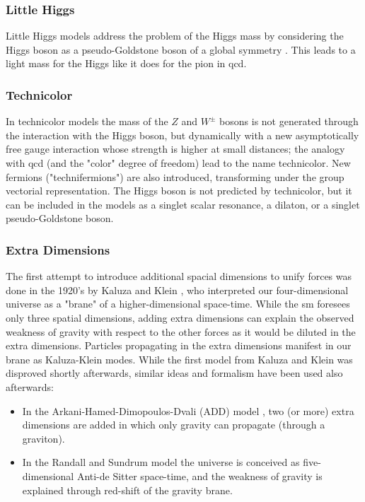 \subsubsection*{Little Higgs}
Little Higgs models address the problem of the Higgs mass by considering the Higgs boson as a pseudo-Goldstone boson of a global symmetry \cite{PhysRevD.12.508, Kaplan:1983fs, KAPLAN1984187, DUGAN1985299}. This leads to a light mass for the Higgs like it does for the pion in \gls{qcd}.

\subsubsection*{Technicolor}
In technicolor models \cite{Weinberg:1975gm, PhysRevD.20.2619} the mass of the $Z$ and $W^{\pm}$ bosons is not generated through the interaction with the Higgs boson, but dynamically with a new asymptotically free gauge interaction whose strength is higher at small distances; the analogy with \gls{qcd} (and the "color" degree of freedom) lead to the name technicolor. New fermions ("technifermions") are also introduced, transforming under the group vectorial representation. The Higgs boson is not predicted by technicolor, but it can be included in the models as a singlet scalar resonance, a dilaton, or a singlet pseudo-Goldstone boson.

\subsubsection*{Extra Dimensions}

The first attempt to introduce additional spacial dimensions to unify forces was done in the 1920's by Kaluza and Klein \cite{Kaluza, Klein:1926tv}, who interpreted our four-dimensional universe as a "brane" of a higher-dimensional space-time. While the \gls{sm} foresees only three spatial dimensions, adding extra dimensions can explain the observed weakness of gravity with respect to the other forces as it would be diluted in the extra dimensions. 
Particles propagating in the extra dimensions manifest in our brane as Kaluza-Klein modes. %
While the first model from Kaluza and Klein was disproved shortly afterwards, similar ideas and formalism have been used also afterwards:  

\begin{itemize}
\item In the Arkani-Hamed-Dimopoulos-Dvali (ADD) model \cite{ArkaniHamed:1998rs}, two (or more) extra dimensions are added in which only gravity can propagate (through a graviton).
\item In the Randall and Sundrum model \cite{PhysRevLett.83.3370} the universe is conceived as five-dimensional Anti-de Sitter space-time, and the weakness of gravity is explained through red-shift of the gravity brane.
\end{itemize}


